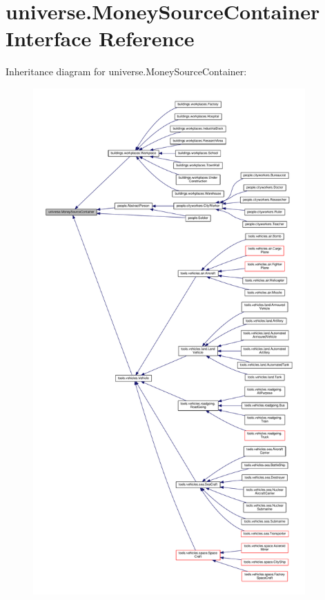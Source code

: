 \hypertarget{interfaceuniverse_1_1_money_source_container}{}\section{universe.\+Money\+Source\+Container Interface Reference}
\label{interfaceuniverse_1_1_money_source_container}


Inheritance diagram for universe.\+Money\+Source\+Container\+:
\nopagebreak
\begin{figure}[H]
\begin{center}
\leavevmode
\includegraphics[height=550pt]{interfaceuniverse_1_1_money_source_container__inherit__graph}
\end{center}
\end{figure}
